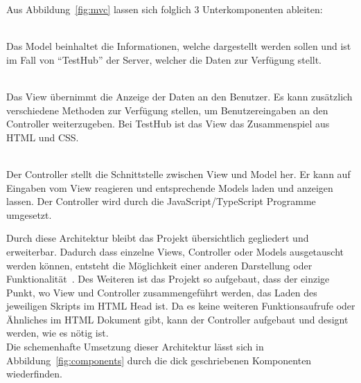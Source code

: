 Aus Abbildung~\ref{fig:mvc} lassen sich folglich 3 Unterkomponenten ableiten:
\begin{description}
    \hfill\\
    Das Model beinhaltet die Informationen, welche dargestellt werden sollen und
    ist im Fall von ``TestHub'' der Server, welcher die Daten zur Verfügung stellt.

    \hfill\\
    Das View übernimmt die Anzeige der Daten an den Benutzer. Es kann zusätzlich
    verschiedene Methoden zur Verfügung stellen, um Benutzereingaben an den Controller
    weiterzugeben. Bei TestHub ist das View das Zusammenspiel aus \gls{HTML} und \gls{CSS}.

    \hfill\\
    Der Controller stellt die Schnittstelle zwischen View und Model her. Er kann 
    auf Eingaben vom View reagieren und entsprechende Models laden und anzeigen lassen.
    Der Controller wird durch die JavaScript/TypeScript Programme umgesetzt.
\end{description}

Durch diese Architektur bleibt das Projekt übersichtlich gegliedert und erweiterbar.
Dadurch dass einzelne Views, Controller oder Models ausgetauscht werden können, 
entsteht die Möglichkeit einer anderen Darstellung oder Funktionalität~\cite{Aug20}.
Des Weiteren ist das Projekt so 
aufgebaut, dass der einzige Punkt, wo View und Controller zusammengeführt werden,
das Laden des jeweiligen Skripts im \gls{HTML} Head ist. Da es keine weiteren 
Funktionsaufrufe oder Ähnliches im \gls{HTML} Dokument gibt, kann der Controller
aufgebaut und designt werden, wie es nötig ist. \\

Die schemenhafte Umsetzung dieser Architektur lässt sich in Abbildung~\ref{fig:components}
durch die dick geschriebenen Komponenten wiederfinden.

\newpage